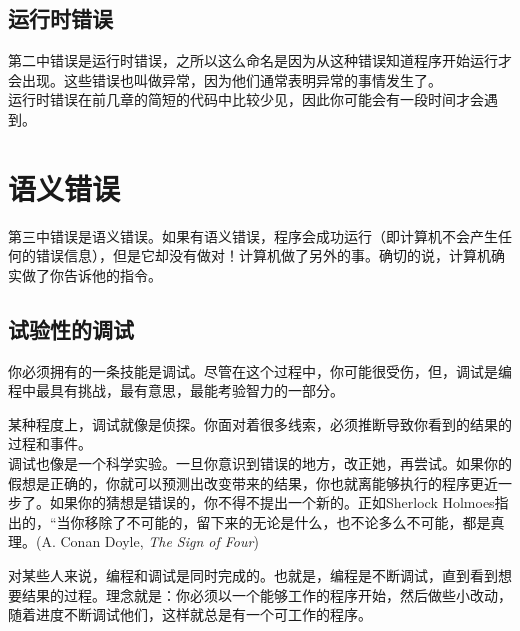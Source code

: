 \subsection{运行时错误}
\label{runtime 运行时}


第二中错误是运行时错误，之所以这么命名是因为从这种错误知道程序开始运行才会出现。这些错误也叫做异常，因为他们通常表明异常的事情发生了。\\

运行时错误在前几章的简短的代码中比较少见，因此你可能会有一段时间才会遇到。

\section{语义错误}

第三中错误是语义错误。如果有语义错误，程序会成功运行（即计算机不会产生任何的错误信息），但是它却没有做对！计算机做了另外的事。确切的说，计算机确实做了你告诉他的指令。

\subsection{试验性的调试}

你必须拥有的一条技能是调试。尽管在这个过程中，你可能很受伤，但，调试是编程中最具有挑战，最有意思，最能考验智力的一部分。\\


某种程度上，调试就像是侦探。你面对着很多线索，必须推断导致你看到的结果的过程和事件。\\

调试也像是一个科学实验。一旦你意识到错误的地方，改正她，再尝试。如果你的假想是正确的，你就可以预测出改变带来的结果，你也就离能够执行的程序更近一步了。如果你的猜想是错误的，你不得不提出一个新的。正如Sherlock Holmoes指出的，“当你移除了不可能的，留下来的无论是什么，也不论多么不可能，都是真理。(A. Conan Doyle, {\em The Sign of Four})\\


对某些人来说，编程和调试是同时完成的。也就是，编程是不断调试，直到看到想要结果的过程。理念就是：你必须以一个能够工作的程序开始，然后做些小改动，随着进度不断调试他们，这样就总是有一个可工作的程序。\\

